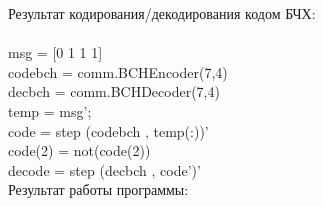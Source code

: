 \documentclass[12pt,a4paper]{report}
\begin{document}
Результат кодирования/декодирования кодом БЧХ:\\\\
msg = [0 1 1 1]\\
codebch = comm.BCHEncoder(7,4)\\
decbch = comm.BCHDecoder(7,4)\\
temp = msg';\\
code = step (codebch , temp(:))'\\
code(2) = not(code(2))\\
decode = step (decbch , code')'\\
\newpage
Результат работы программы:
\begin{figure}[h!]
\end{figure}
\begin{figure}[h!]
\end{figure}
\end{document}
